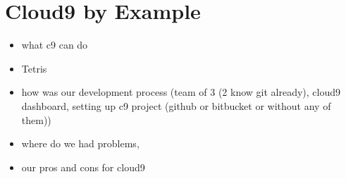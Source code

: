 \section{Cloud9 by Example}
\label{sec:Motivation}

\begin{itemize}
	\item what c9 can do
	\item Tetris
	\item how was our development process (team of 3 (2 know git already), cloud9 dashboard, setting up c9 project (github or bitbucket or without any of them))
	\item where do we had problems,
	\item our pros and cons for cloud9
\end{itemize}


